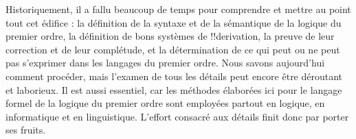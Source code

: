\documentclass[../../../include/open-logic-section]{subfiles}
\begin{document}
Historiquement, il a fallu beaucoup de temps pour comprendre et mettre
au point tout cet édifice : la définition de la syntaxe et de la
sémantique de la logique du premier ordre, la définition de bons
systèmes de !!{derivation}, la preuve de leur correction et de leur
complétude, et la détermination de ce qui peut ou ne peut pas s'exprimer
dans les langages du premier ordre. Nous savons aujourd'hui comment
procéder, mais l'examen de tous les détails peut encore être déroutant
et laborieux. Il est aussi essentiel, car les méthodes élaborées ici
pour le langage formel de la logique du premier ordre sont employées
partout en logique, en informatique et en linguistique. L'effort
consacré aux détails finit donc par porter ses fruits.
\end{document}
